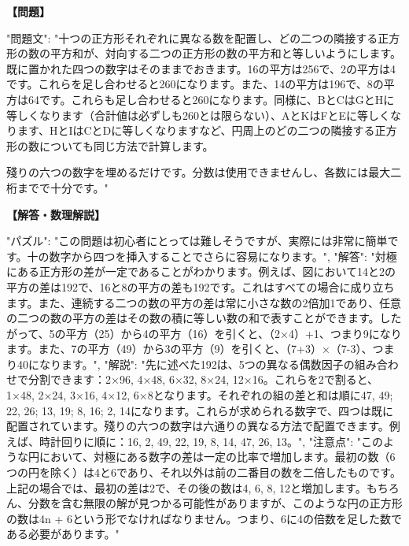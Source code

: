 \documentclass[10pt,a4paper,oneside,openany]{ltjsbook}
\begin{document}
\begin{tcolorbox}[colback=softblue,colframe=primaryblue,title=\textbf{第 118 問：CIRCLING THE SQUARES.},arc=2mm,boxrule=1pt,breakable]
\textbf{【問題】}\par\vspace{0.3em}
{
  "問題文": "十つの正方形それぞれに異なる数を配置し、どの二つの隣接する正方形の数の平方和が、対向する二つの正方形の数の平方和と等しいようにします。既に置かれた四つの数字はそのままでおきます。16の平方は256で、2の平方は4です。これらを足し合わせると260になります。また、14の平方は196で、8の平方は64です。これらも足し合わせると260になります。同様に、BとCはGとHに等しくなります（合計値は必ずしも260とは限らない）、AとKはFとEに等しくなります、HとIはCとDに等しくなりますなど、円周上のどの二つの隣接する正方形の数についても同じ方法で計算します。

殘りの六つの数字を埋めるだけです。分数は使用できませんし、各数には最大二桁までで十分です。"
}
\tcblower
\textbf{【解答・数理解説】}\par\vspace{0.3em}
{
"パズル": "この問題は初心者にとっては難しそうですが、実際には非常に簡単です。十の数字から四つを挿入することでさらに容易になります。",
"解答": "対極にある正方形の差が一定であることがわかります。例えば、図において14と2の平方の差は192で、16と8の平方の差も192です。これはすべての場合に成り立ちます。また、連続する二つの数の平方の差は常に小さな数の2倍加1であり、任意の二つの数の平方の差はその数の積に等しい数の和で表すことができます。したがって、5の平方（25）から4の平方（16）を引くと、（2×4）+1、つまり9になります。また、7の平方（49）から3の平方（9）を引くと、（7+3）×（7-3）、つまり40になります。",
"解説": "先に述べた192は、5つの異なる偶数因子の組み合わせで分割できます：2×96, 4×48, 6×32, 8×24, 12×16。これらを2で割ると、1×48, 2×24, 3×16, 4×12, 6×8となります。それぞれの組の差と和は順に47, 49; 22, 26; 13, 19; 8, 16; 2, 14になります。これらが求められる数字で、四つは既に配置されています。殘りの六つの数字は六通りの異なる方法で配置できます。例えば、時計回りに順に：16, 2, 49, 22, 19, 8, 14, 47, 26, 13。",
"注意点": "このような円において、対極にある数字の差は一定の比率で増加します。最初の数（6つの円を除く）は4と6であり、それ以外は前の二番目の数を二倍したものです。上記の場合では、最初の差は2で、その後の数は4, 6, 8, 12と増加します。もちろん、分数を含む無限の解が見つかる可能性がありますが、このような円の正方形の数は4n + 6という形でなければなりません。つまり、6に4の倍数を足した数である必要があります。"
}
\end{tcolorbox}
\end{document}
